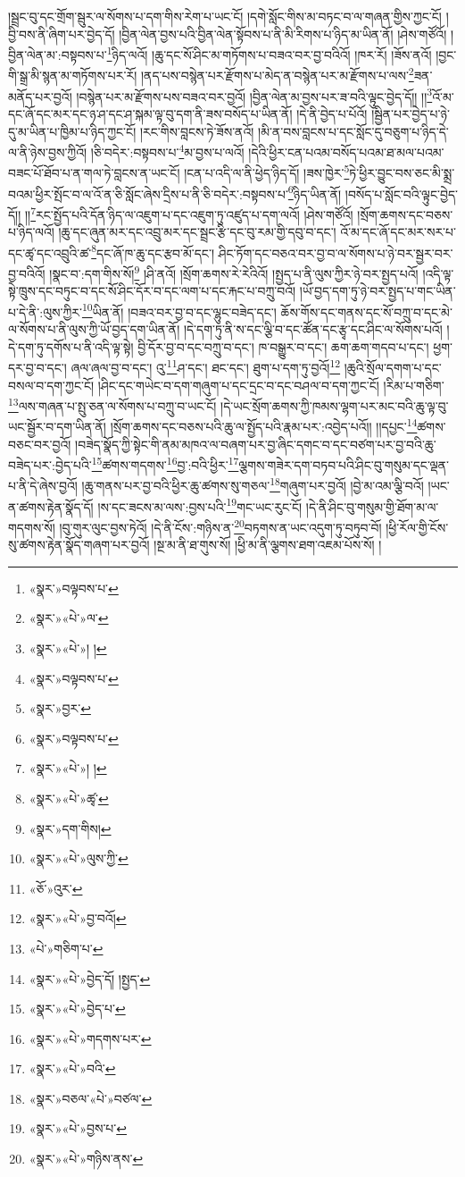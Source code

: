 །སྦྲང་བུ་དང་གྲོག་སྦུར་ལ་སོགས་པ་དག་གིས་རེག་པ་ཡང་ངོ། །དགེ་སློང་གིས་མ་བཏང་བ་ལ་གཞན་གྱིས་ཀྱང་ངོ། །བྱི་བས་ནི་ཞིག་པར་བྱེད་དོ། །བྱིན་ལེན་བྱས་པའི་བྱིན་ལེན་སྟོབས་པ་ནི་མི་རིགས་པ་ཉིད་མ་ཡིན་ནོ། །ཤེས་གཙོའོ། །
བྱིན་ལེན་མ་:བསྟབས་པ་\footnote{«སྣར་»བལྟབས་པ་}ཉིད་ལའོ། །ཆུ་དང་སོ་ཤིང་མ་གཏོགས་པ་བཟའ་བར་བྱ་བའིའོ། །ཁར་རོ། །ཟོས་ནའོ། །བྱང་གི་སྒྲ་མི་སྙན་མ་གཏོགས་པར་རོ། །ནད་པས་བསྙེན་པར་རྫོགས་པ་མེད་ན་བསྙེན་པར་མ་རྫོགས་པ་ལས་\footnote{«སྣར་»«པེ་»ལ་}ཟན་མནོད་པར་བྱའོ། །བསྙེན་པར་མ་རྫོགས་པས་བཟའ་བར་བྱའོ། །བྱིན་ལེན་མ་བྱས་པར་ཟ་བའི་ལྟུང་བྱེད་དོ།། །།\footnote{«སྣར་»«པེ་»། །}འོ་མ་དང་ཞོ་དང་མར་དང་ཉ་ཤ་དང་ཤ་སྐམ་ལྟ་བུ་དག་ནི་ཟས་བསོད་པ་ཡིན་ནོ། །དེ་ནི་བྱེད་པ་པོའོ། །སྦྱིན་པར་བྱེད་པ་ཉེ་དུ་མ་ཡིན་པ་ཁྱིམ་པ་ཉིད་ཀྱང་ངོ། །རང་གིས་བླངས་ཏེ་ཟོས་ནའོ། །མི་ན་བས་བླངས་པ་དང་སློང་དུ་བཅུག་པ་ཉིད་དེ་ལ་ནི་ཉེས་བྱས་ཀྱིའོ། །ཅི་བདེར་:བསྟབས་པ་\footnote{«སྣར་»བལྟབས་པ་}མ་བྱས་པ་ལའོ། །དེའི་ཕྱིར་ངན་པའམ་བསོད་པའམ་ཐ་མལ་པའམ་བཟང་པོ་ཐོབ་པ་ན་གལ་ཏེ་བླངས་ན་ཡང་ངོ། །ངན་པ་འདི་ལ་ནི་ཕྱེད་ཉིད་དོ། །ཟས་ཁྱེར་\footnote{«སྣར་»བྱར་}ཏེ་ཕྱིར་བྱུང་བས་ཅང་མི་སྨྲ་བའམ་ཕྱིར་སྤོང་བ་ལ་འོ་ན་ཅི་སློང་ཞེས་དྲིས་པ་ནི་ཅི་བདེར་:བསྟབས་པ་\footnote{«སྣར་»བལྟབས་པ་}ཉིད་ཡིན་ནོ། །བསོད་པ་སློང་བའི་ལྟུང་བྱེད་དོ།། །།\footnote{«སྣར་»«པེ་»། །}རང་སྤྱོད་པའི་དོན་ཉིད་ལ་འཇུག་པ་དང་འཇུག་ཏུ་འཛུད་པ་དག་ལའོ། །ཤེས་གཙོའོ། །སྲོག་ཆགས་དང་བཅས་པ་ཉིད་ལའོ། །ཆུ་དང་ཞུན་མར་དང་འབྲུ་མར་དང་སྦྲང་རྩི་དང་བུ་རམ་གྱི་དབུ་བ་དང་། འོ་མ་དང་ཞོ་དང་མར་སར་པ་དང་ཚྭ་དང་འབྲུའི་ཚ་\footnote{«སྣར་»«པེ་»ཚྭ་}དང་ཞོ་ཁ་ཆུ་དང་རྩབ་མོ་དང་། ཤིང་ཏོག་དང་བཅའ་བར་བྱ་བ་ལ་སོགས་པ་ཉེ་བར་སྦྱར་བར་བྱ་བའིའོ། །སྣང་བ་:དག་གིས་སོ།\footnote{«སྣར་»དག་གིས།} །ཤི་ནའོ། །སྲོག་ཆགས་རེ་རེའིའོ། །སྤྱད་པ་ནི་ལུས་ཀྱིར་ཉེ་བར་སྤྱད་པའོ། །འདི་ལྟ་སྟེ་ཁྲུས་དང་བཏུང་བ་དང་སོ་ཤིང་དོར་བ་དང་ལག་པ་དང་རྐང་པ་བཀྲུ་བའོ། །ཡོ་བྱད་དག་ཏུ་ཉེ་བར་སྤྱད་པ་གང་ཡིན་པ་དེ་ནི་:ལུས་ཀྱིར་\footnote{«སྣར་»«པེ་»ལུས་ཀྱི་}ཡིན་ནོ། །བཟའ་བར་བྱ་བ་དང་ལྷུང་བཟེད་དང་། ཆོས་གོས་དང་གནས་དང་སོ་བཀྲུ་བ་དང་མེ་ལ་སོགས་པ་ནི་ལུས་ཀྱི་ཡོ་བྱད་དག་ཡིན་ནོ། །དེ་དག་ཏུ་ནི་ས་དང་ལྕི་བ་དང་ཚོན་དང་རྩྭ་དང་ཤིང་ལ་སོགས་པའོ། །དེ་དག་ཏུ་དགོས་པ་ནི་འདི་ལྟ་སྟེ། བྱི་དོར་བྱ་བ་དང་བཀྲུ་བ་དང་། ཁ་བསྒྱུར་བ་དང་། ཆག་ཆག་གདབ་པ་དང་། ཕྱག་དར་བྱ་བ་དང་། ཞལ་ཞལ་བྱ་བ་དང་། འུ་\footnote{«ཅོ་»འུར་}ཤ་དང་། ཐང་དང་། ཐུག་པ་དག་ཏུ་བྱའོ།\footnote{«སྣར་»«པེ་»བྱ་བའོ།} །ཆུའི་སྲོལ་དགག་པ་དང་བསལ་བ་དག་ཀྱང་ངོ། །ཤིང་དང་གཡེང་བ་དག་གཞུག་པ་དང་དྲང་བ་དང་བཤལ་བ་དག་ཀྱང་ངོ། །རིམ་པ་གཅིག་\footnote{«པེ་»གཅིག་པ་}ལས་གཞན་པ་སྤུ་ཅན་ལ་སོགས་པ་བཀྲུ་བ་ཡང་ངོ། །དེ་ཡང་སྲོག་ཆགས་ཀྱི་ཁམས་ལྷག་པར་མང་བའི་ཆུ་ལྟ་བུ་ཡང་སྦྱོར་བ་དག་ཡིན་ནོ། །སྲོག་ཆགས་དང་བཅས་པའི་ཆུ་ལ་སྤྱོད་པའི་རྣམ་པར་:འབྱེད་པའོ།། །།དཔྱང་\footnote{«སྣར་»«པེ་»བྱེད་དོ། །སྤྱད་}ཚགས་བཅང་བར་བྱའོ། །བཟེད་སྣོད་ཀྱི་སྟེང་གི་ནམ་མཁའ་ལ་བཞག་པར་བྱ་ཞིང་དགང་བ་དང་བཙག་པར་བྱ་བའི་ཆུ་བཟེད་པར་:བྱེད་པའི་\footnote{«སྣར་»«པེ་»བྱེད་པ་}ཚགས་གདགས་\footnote{«སྣར་»«པེ་»གདགས་པར་}བྱ་:བའི་ཕྱིར་\footnote{«སྣར་»«པེ་»བའི་}ལྕགས་གཟེར་དག་བཏབ་པའི་ཤིང་བུ་གསུམ་དང་ལྡན་པ་ནི་དེ་ཞེས་བྱའོ། །ཆུ་གནས་པར་བྱ་བའི་ཕྱིར་ཆུ་ཚགས་སུ་གཅལ་\footnote{«སྣར་»བཅལ་«པེ་»བཙལ་}གཞུག་པར་བྱའོ། །བྱེ་མ་འམ་ལྕི་བའོ། །ཡང་ན་ཚགས་རྟེན་སྣོད་དོ། །ས་དང་ཟངས་མ་ལས་:བྱས་པའི་\footnote{«སྣར་»«པེ་»བྱས་པ་}གང་ཡང་རུང་ངོ། །དེ་ནི་ཤིང་བུ་གསུམ་གྱི་ཐོག་མ་ལ་གདགས་སོ། །བུ་གུར་ལུང་བྱས་ཏེའོ། །དེ་ནི་ངོས་:གཉིས་ན་\footnote{«སྣར་»«པེ་»གཉིས་ནས་}བཏགས་ན་ཡང་འདུག་ཏུ་བཏུབ་བོ། །ཕྱི་རོལ་གྱི་ངོས་སུ་ཚགས་རྟེན་སྣོད་གཞག་པར་བྱའོ། །སྔ་མ་ནི་ཐ་གུས་སོ། །ཕྱི་མ་ནི་ལྕགས་ཐག་འཇམ་པོས་སོ། །
